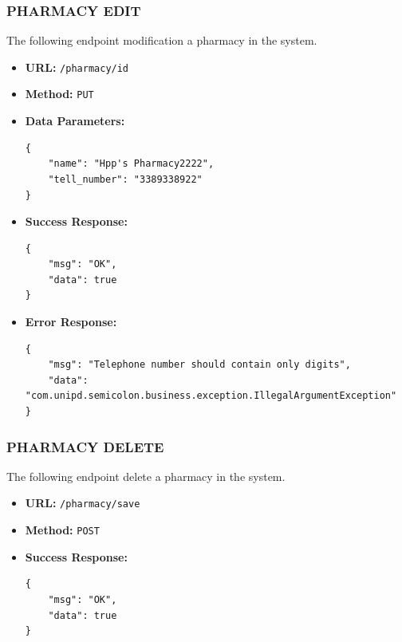 \subsubsection*{PHARMACY EDIT}
The following endpoint modification a pharmacy in the system.
\begin{itemize}
    \item \textbf{URL:}
    \newline \hspace*{1cm} \texttt{/pharmacy/id}  
    \item \textbf{Method:}
    \newline \hspace*{1cm}\texttt{PUT}
    \item \textbf{Data Parameters:}
\begin{lstlisting}[breaklines]
{
    "name": "Hpp's Pharmacy2222",
    "tell_number": "3389338922"
}
\end{lstlisting}
\item \textbf{Success Response:}
\begin{lstlisting}[breaklines]
{
    "msg": "OK",
    "data": true
}
\end{lstlisting}
    \item \textbf{Error Response:}
\begin{lstlisting}[breaklines]
{
    "msg": "Telephone number should contain only digits",
    "data": "com.unipd.semicolon.business.exception.IllegalArgumentException"
}
\end{lstlisting}
\end{itemize}
\subsubsection*{PHARMACY DELETE}
The following endpoint delete a pharmacy in the system.
\begin{itemize}
    \item \textbf{URL:}
    \newline \hspace*{1cm} \texttt{/pharmacy/save}  
    \item \textbf{Method:}
    \newline \hspace*{1cm}\texttt{POST}
  
\item \textbf{Success Response:}
\begin{lstlisting}[breaklines]
{
    "msg": "OK",
    "data": true
}
\end{lstlisting}
\end{itemize}
